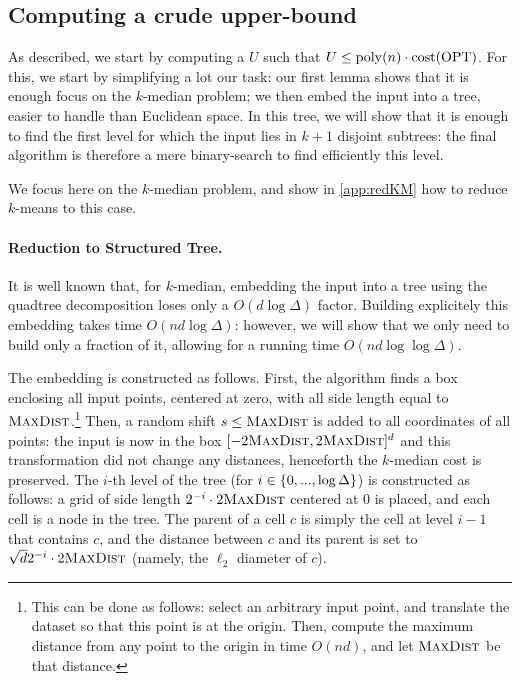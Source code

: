 \subsection{Computing a crude upper-bound}
As described, we start by computing a $U$ such that $U \leq \operatorname{poly}(n) \cdot \operatorname{cost}(\text{OPT})$. For this, we start by simplifying a lot our task: our first lemma shows that it is enough focus on the $k$-median problem; we then embed the input into a tree, easier to handle than Euclidean space. In this tree, we will show that it is enough to find the first level for which the input lies in $k+1$ disjoint subtrees: the final algorithm is therefore a mere binary-search to find efficiently this level.


We focus here on the $k$-median problem, and show in \cref{app:redKM} how to reduce $k$-means to this case.

\paragraph{Reduction to Structured Tree.}
\newcommand{\boxsize}{\textsc{MaxDist}}
It is well known that, for $k$-median, embedding the input into a tree using the quadtree decomposition loses only a $O(d \log \Delta)$ factor. Building explicitely this embedding takes time $O(nd \log \Delta)$: however, we will show that we only need to build only a fraction of it, allowing for a running time $O(nd \log \log \Delta)$. 

The embedding is constructed as follows. First, the algorithm finds a box enclosing all input points, centered at zero, with all side length equal to $\boxsize$.\footnote{This can be done as follows: select an arbitrary input point, and translate the dataset so that this point is at the origin. Then, compute the maximum distance from any point to the origin in time $O(nd)$, and let $\boxsize$ be that distance.} Then, a random shift $s \leq \boxsize$ is added to all coordinates of all points: the input is now in the box $[-2\boxsize, 2\boxsize]^d$ and this transformation did not change any distances, henceforth the $k$-median cost is preserved. 
The $i$-th level of the tree (for $i \in \left\{ 0, ..., \log \Delta \right\}$) is constructed as follows: a grid of side length $2^{-i} \cdot 2\boxsize$ centered at $0$ is placed, and each cell is a node in the tree.
 The parent of a cell $c$ is simply the cell at level $i-1$ that contains $c$, and the distance between $c$ and its parent is set to $\sqrt{d}2^{-i} \cdot 2\boxsize$ (namely, the $\ell_2$ diameter of $c$).
 
